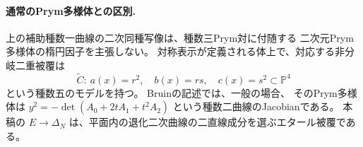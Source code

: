 \paragraph{通常のPrym多様体との区別.}
上の補助種数一曲線の二次同種写像は、種数三Prym対に付随する
二次元Prym多様体の楕円因子を主張しない。
対称表示が定義される体上で、対応する非分岐二重被覆は
\[
 \widetilde C:\ a(x)=r^2,\quad b(x)=rs,\quad c(x)=s^2
          \subset\mathbb P^4
\]
という種数五のモデルを持つ。
Bruinの記述\cite[Theorem 5.1, case 4]{BruinPrymGenusThree}では、一般の場合、
そのPrym多様体は $y^2=-\det(A_0+2tA_1+t^2A_2)$ という種数二曲線のJacobianである。
本稿の $E\to\Delta_N$ は、平面内の退化二次曲線の二直線成分を選ぶエタール被覆である。
